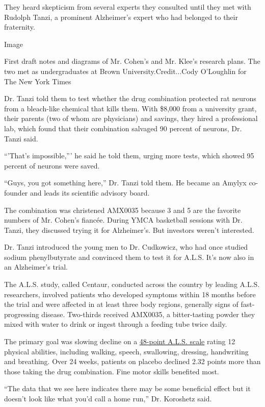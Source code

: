 They heard skepticism from several experts they consulted until they met
with Rudolph Tanzi, a prominent Alzheimer's expert who had belonged to
their fraternity.

Image

First draft notes and diagrams of Mr. Cohen's and Mr. Klee's research
plans. The two met as undergraduates at Brown University.Credit...Cody
O'Loughlin for The New York Times

Dr. Tanzi told them to test whether the drug combination protected rat
neurons from a bleach-like chemical that kills them. With \$8,000 from a
university grant, their parents (two of whom are physicians) and
savings, they hired a professional lab, which found that their
combination salvaged 90 percent of neurons, Dr. Tanzi said.

``'That's impossible,''' he said he told them, urging more tests, which
showed 95 percent of neurons were saved.

``Guys, you got something here,'' Dr. Tanzi told them. He became an
Amylyx co-founder and leads its scientific advisory board.

The combination was christened AMX0035 because 3 and 5 are the favorite
numbers of Mr. Cohen's fiancée. During YMCA basketball sessions with Dr.
Tanzi, they discussed trying it for Alzheimer's. But investors weren't
interested.

Dr. Tanzi introduced the young men to Dr. Cudkowicz, who had once
studied sodium phenylbutyrate and convinced them to test it for A.L.S.
It's now also in an Alzheimer's trial.

The A.L.S. study, called Centaur, conducted across the country by
leading A.L.S. researchers, involved patients who developed symptoms
within 18 months before the trial and were affected in at least three
body regions, generally signs of fast-progressing disease. Two-thirds
received AMX0035, a bitter-tasting powder they mixed with water to drink
or ingest through a feeding tube twice daily.

The primary goal was slowing decline on a
\href{https://www.mdcalc.com/revised-amyotrophic-lateral-sclerosis-functional-rating-scale-alsfrs-r\#use-cases}{48-point
A.L.S. scale} rating 12 physical abilities, including walking, speech,
swallowing, dressing, handwriting and breathing. Over 24 weeks, patients
on placebo declined 2.32 points more than those taking the drug
combination. Fine motor skills benefited most.

``The data that we see here indicates there may be some beneficial
effect but it doesn't look like what you'd call a home run,'' Dr.
Koroshetz said.

